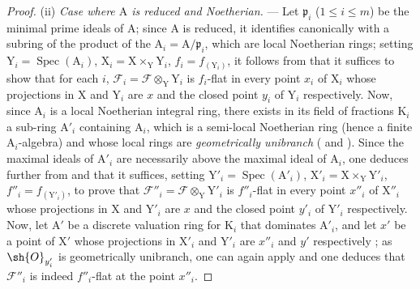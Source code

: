 \begin{proof}
(ii) \emph{Case where $\mathrm{A}$ is reduced and Noetherian.} --- Let $\mathfrak{p}_i$ ($1\leq i\leq m$) be the minimal prime ideals of $\mathrm{A}$; since $\mathrm{A}$ is reduced, it identifies canonically with a subring of the product of the $\mathrm{A}_i=\mathrm{A}/\mathfrak{p}_i$, which are local Noetherian rings; setting $\mathrm{Y}_i=\operatorname{Spec}(\mathrm{A}_i)$, $\mathrm{X}_i=\mathrm{X}\times_\mathrm{Y}\mathrm{Y}_i$, $f_i=f_{(\mathrm{Y}_i)}$, it follows from  that it suffices to show that for each $i$, $\mathscr{F}_i=\mathscr{F}\otimes_\mathrm{Y}\mathrm{Y}_i$ is $f_i$-flat in every point $x_i$ of $\mathrm{X}_i$ whose projections in $\mathrm{X}$ and $\mathrm{Y}_i$ are $x$ and the closed point $y_i$ of $\mathrm{Y}_i$ respectively.
Now, since $\mathrm{A}_i$ is a local Noetherian integral ring, there exists in its field of fractions $\mathrm{K}_i$ a sub-ring $\mathrm{A}'_i$ containing $\mathrm{A}_i$, which is a semi-local Noetherian ring (hence a finite $\mathrm{A}_i$-algebra) and whose local rings are \emph{geometrically unibranch} ( and ).
Since the maximal ideals of $\mathrm{A}'_i$ are necessarily above the maximal ideal of $\mathrm{A}_i$, one deduces further from  and  that it suffices, setting $\mathrm{Y}'_i=\operatorname{Spec}(\mathrm{A}'_i)$, $\mathrm{X}'_i=\mathrm{X}\times_\mathrm{Y}\mathrm{Y}'_i$, $f''_i=f_{(\mathrm{Y}'_i)}$, to prove that $\mathscr{F}''_i=\mathscr{F}\otimes_\mathrm{Y}\mathrm{Y}'_i$ is $f''_i$-flat in every point $x''_i$ of $\mathrm{X}''_i$ whose projections in $\mathrm{X}$ and $\mathrm{Y}'_i$ are $x$ and the closed point $y'_i$ of $\mathrm{Y}'_i$ respectively.
Now, let $\mathrm{A}'$ be a discrete valuation ring for $\mathrm{K}_i$ that dominates $\mathrm{A}'_i$, and let $x'$ be a point of $\mathrm{X}'$ whose projections in $\mathrm{X}'_i$ and $\mathrm{Y}'_i$ are $x''_i$ and $y'$ respectively ; as $\sh{O}_{y'_i}$ is geometrically unibranch, one can again apply  and one deduces that $\mathscr{F}''_i$ is indeed $f''_i$-flat at the point $x''_i$.
\end{proof}

